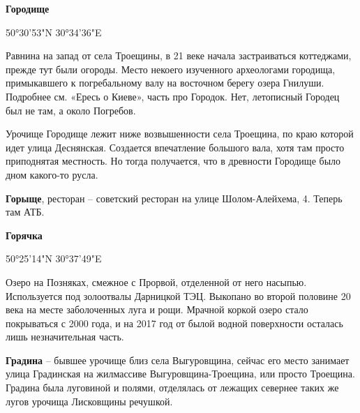 \medskip


\textbf{Городище}

50°30'53"N 30°34'36"E

Равнина на запад от села Троещины, в 21 веке начала застраиваться коттеджами, прежде тут были огороды. Место некоего изученного археологами городища, примыкавшего к погребальному валу на восточном берегу озера Гнилуши. Подробнее см. «Ересь о Киеве», часть про Городок. Нет, летописный Городец был не там, а около Погребов.

Урочище Городище лежит ниже возвышенности села Троещина, по краю которой идет улица Деснянская. Создается впечатление большого вала, хотя там просто приподнятая местность. Но тогда получается, что в древности Городище было дном какого-то русла.\\

\medskip

\textbf{Горыще}, ресторан – советский ресторан на улице Шолом-Алейхема, 4. Теперь там АТБ.\\

\medskip

\textbf{Горячка}

50°25'14"N 30°37'49"E

Озеро на Позняках, смежное с Прорвой, отделенной от него насыпью. Используется под золоотвалы Дарницкой ТЭЦ. Выкопано во второй половине 20 века на месте заболоченных луга и рощи. Мрачной коркой озеро стало покрываться с 2000 года, и на 2017 год от былой водной поверхности осталась лишь незначительная часть.\\

\medskip

\textbf{Градина} – бывшее урочище близ села Выгуровщина, сейчас его место занимает улица Градинская на жилмассиве Выгуровщина-Троещина, или просто Троещина. Градина была луговиной и полями, отделялась от лежащих севернее таких же лугов урочища Лисковщины речушкой.
